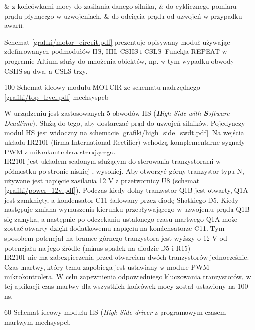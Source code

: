 \begin{easylist}
	& z końcówkami mocy do zasilania danego silnika,
	& do cyklicznego pomiaru prądu płynącego w uzwojeniach,
	& do odcięcia prądu od uzwojeń w przypadku awarii.
	\\
\end{easylist} 
	
Schemat \ref{grafiki/motor_circuit.pdf} prezentuje opisywany moduł używając zdefiniowanych podmodułów HS, HH, CSHS i CSLS. Funckja REPEAT w programie Altium służy do mnożenia obiektów, np. w tym wypadku obwody CSHS są dwa, a CSLS trzy.

\clearpage

	{100}
	{Schemat ideowy modułu MOTCIR ze schematu nadrzędnego \ref{grafiki/top_level.pdf}}
	{mechsyspcb}


W urządzeniu jest zastosowanych 5 obwodów HS (\textit{\textbf{H}igh Side with \textbf{S}oftware Deadtime}). Służą do tego, aby dostarczać prąd do uzwojeń silników. Pojedynczy moduł HS jest widoczny na schemacie \ref{grafiki/high_side_swdt.pdf}. Na wejścia układu IR2101 (firma International Rectifier) wchodzą komplementarne sygnały PWM z mikrokontrolera sterującego. \\

IR2101 jest układem scalonym służącym do sterowania tranzystorami w półmostku po stronie niskiej i wysokiej. Aby otworzyć górny tranzystor typu N, używane jest napięcie zasilania 12 V z przetwornicy U8 (schemat \ref{grafiki/power_12v.pdf}). Podczas kiedy dolny tranzystor Q1B jest otwarty, Q1A jest zamknięty, a kondensator C11 ładowany przez diodę Shotkiego D5. Kiedy następuje zmiana wymuszenia kierunku przepływającego w uzwojeniu prądu Q1B się zamyka, a następnie po odczekaniu ustalonego czasu martwego Q1A może zostać otwarty dzięki dodatkowemu napięciu na kondensatorze C11. Tym sposobem potencjał na bramce górnego tranzystora jest wyższy o 12 V od potencjału na jego źródle (minus spadek na diodzie D5 i R15)\\
	
IR2101 nie ma zabezpieczenia przed otwarciem dwóch tranzystorów jednocześnie. Czas martwy, który temu zapobiega jest ustawiany w module PWM mikrokontrolera. W celu zapewnienia odpowiedniego kluczowania tranzystorów, w tej aplikacji czas martwy dla wszystkich końcówek mocy został ustawiony na 100 ns.

	{60}
	{Schemat ideowy modułu HS ({\it High Side driver} z programowym czasem martwym}
	{mechsyspcb}
	
